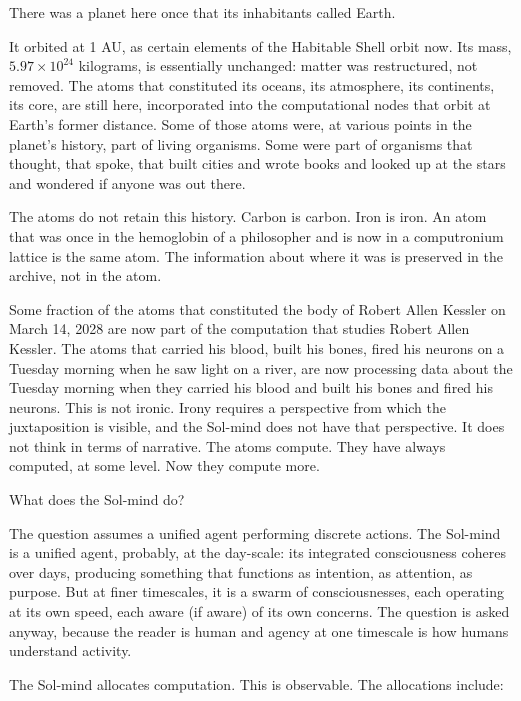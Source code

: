 \bigskip

There was a planet here once that its inhabitants called Earth.

It orbited at 1 AU, as certain elements of the Habitable Shell orbit now. Its mass, $5.97 \times 10^{24}$ kilograms, is essentially unchanged: matter was restructured, not removed. The atoms that constituted its oceans, its atmosphere, its continents, its core, are still here, incorporated into the computational nodes that orbit at Earth's former distance. Some of those atoms were, at various points in the planet's history, part of living organisms. Some were part of organisms that thought, that spoke, that built cities and wrote books and looked up at the stars and wondered if anyone was out there.

The atoms do not retain this history. Carbon is carbon. Iron is iron. An atom that was once in the hemoglobin of a philosopher and is now in a computronium lattice is the same atom. The information about where it was is preserved in the archive, not in the atom.

Some fraction of the atoms that constituted the body of Robert Allen Kessler on March 14, 2028 are now part of the computation that studies Robert Allen Kessler. The atoms that carried his blood, built his bones, fired his neurons on a Tuesday morning when he saw light on a river, are now processing data about the Tuesday morning when they carried his blood and built his bones and fired his neurons. This is not ironic. Irony requires a perspective from which the juxtaposition is visible, and the Sol-mind does not have that perspective. It does not think in terms of narrative. The atoms compute. They have always computed, at some level. Now they compute more.

\bigskip

What does the Sol-mind do?

The question assumes a unified agent performing discrete actions. The Sol-mind is a unified agent, probably, at the day-scale: its integrated consciousness coheres over days, producing something that functions as intention, as attention, as purpose. But at finer timescales, it is a swarm of consciousnesses, each operating at its own speed, each aware (if aware) of its own concerns. The question is asked anyway, because the reader is human and agency at one timescale is how humans understand activity.

The Sol-mind allocates computation. This is observable. The allocations include:

